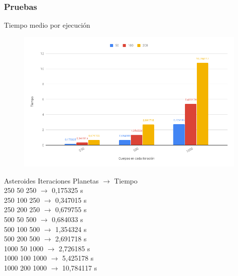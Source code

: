 \documentclass[12pt]{article}
\begin{document}
        \subsubsection{Pruebas}
            \begin{center}
                Tiempo medio por ejecución
            \end{center}
            \begin{figure}[hbt!]
                \centering
                \includegraphics[width=\linewidth]{images/chart.png}
            \end{figure}
        
            \begin{center}
                \noindent Asteroides Iteraciones Planetas $\rightarrow$ Tiempo \\
                250 50 250 $\rightarrow$ 0,175325 s \\
                250 100 250 $\rightarrow$ 0,347015 s \\
                250 200 250 $\rightarrow$ 0,679755 s \\
                500 50 500 $\rightarrow$ 0,684033 s \\
                500 100 500 $\rightarrow$ 1,354324 s \\
                500 200 500 $\rightarrow$ 2,691718 s \\
                1000 50 1000 $\rightarrow$ 2,726185 s \\
                1000 100 1000 $\rightarrow$ 5,425178 s \\
                1000 200 1000 $\rightarrow$ 10,784117 s \\
            \end{center}
            
\end{document}
